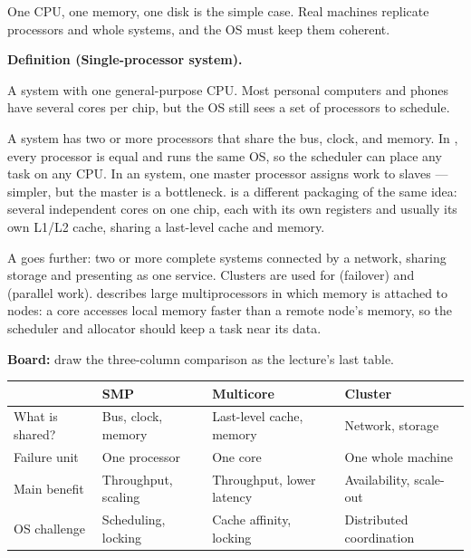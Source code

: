 \documentclass[11pt]{article}
\newenvironment{definitionbox}[1]{%
  \par\noindent\textbf{Definition (#1).}\ \itshape
}{\par\vspace{0.3em}}
\begin{document}
One CPU, one memory, one disk is the simple case. Real machines replicate
processors and whole systems, and the OS must keep them coherent.

\begin{definitionbox}{Single-processor system}
A system with one general-purpose CPU. Most personal computers and phones have
several cores per chip, but the OS still sees a set of processors to schedule.
\end{definitionbox}

A  system has two or more processors that share the bus,
clock, and memory. In , every processor is
equal and runs the same OS, so the scheduler can place any task on any CPU. In an
 system, one master processor assigns work to slaves --- simpler,
but the master is a bottleneck.  is a different packaging of the
same idea: several independent cores on one chip, each with its own registers and
usually its own L1/L2 cache, sharing a last-level cache and memory.

A  goes further: two or more complete systems connected by a
network, sharing storage and presenting as one service. Clusters are used for
 (failover) and 
(parallel work).  describes large
multiprocessors in which memory is attached to nodes: a core accesses local
memory faster than a remote node's memory, so the scheduler and allocator should
keep a task near its data.

\textbf{Board:} draw the three-column comparison as the lecture's last table.

\begin{center}
\small
\begin{tabular}{@{}p{2.3cm}p{3.4cm}p{3.5cm}p{4.0cm}@{}}
\toprule
 & \textbf{SMP} & \textbf{Multicore} & \textbf{Cluster} \\
\midrule
What is shared? & Bus, clock, memory & Last-level cache, memory & Network, storage \\
Failure unit & One processor & One core & One whole machine \\
Main benefit & Throughput, scaling & Throughput, lower latency & Availability, scale-out \\
OS challenge & Scheduling, locking & Cache affinity, locking & Distributed coordination \\
\bottomrule
\end{tabular}
\end{center}
\end{document}
